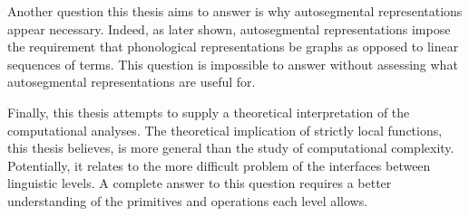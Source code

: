 \documentclass[12pt, a4paper]{report}
\begin{document}
Another question this thesis aims to answer is why autosegmental
representations appear necessary.  Indeed, as later shown,
autosegmental representations impose the requirement that phonological
representations be graphs as opposed to linear sequences of terms.
This question is impossible to answer without assessing what
autosegmental representations are useful for.

Finally, this thesis attempts to supply a theoretical interpretation
of the computational analyses.  The theoretical implication of
strictly local functions, this thesis believes, is more general than
the study of computational complexity.  Potentially, it relates to the
more difficult problem of the interfaces between linguistic levels.  A
complete answer to this question requires a better understanding of
the primitives and operations each level allows.

\printbibliography[heading=bibintoc]

\printindex
\end{document}
